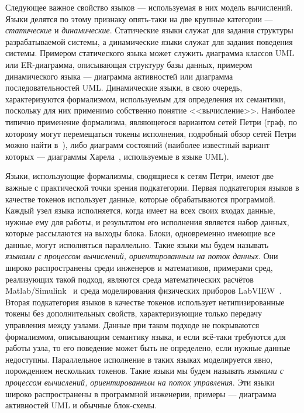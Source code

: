 Следующее важное свойство языков --- используемая в них модель вычислений. Языки 
делятся по этому признаку опять-таки на две крупные категории --- \textit{статические} 
и \textit{динамические}. Статические языки служат для задания структуры разрабатываемой 
системы, а динамические языки служат для задания поведения системы. Примером 
статического языка может служить диаграмма классов \ac{UML} или \ac{ER}-диаграмма, 
описывающая структуру базы данных, примером динамического языка --- диаграмма 
активностей или диаграмма последовательностей \ac{UML}. Динамические языки, в свою 
очередь, характеризуются формализмом, используемым для определения их семантики, 
поскольку для них применимо собственно понятие <<вычисление>>. Наиболее типично 
применение формализма, являющегося вариантом сетей Петри (граф, по которому 
могут перемещаться токены исполнения, подробный обзор сетей Петри можно найти в~\cite{murata1989petri}), 
либо диаграмм состояний (наиболее известный вариант которых --- диаграммы Харела~\cite{harel1987statecharts}, 
используемые в языке \ac{UML}). 

Языки, использующие формализмы, сводящиеся к сетям Петри, имеют две важные с 
практической точки зрения подкатегории. Первая подкатегория языков в качестве 
токенов использует данные, которые обрабатываются программой. Каждый узел языка 
исполняется, когда имеет на всех своих входах данные, нужные ему для работы, 
и результатом его исполнения является набор данных, которые рассылаются на 
выходы блока. Блоки, одновременно имеющие все данные, могут исполняться 
параллельно. Такие языки мы будем называть \textit{языками с процессом вычислений, 
ориентированным на поток данных}. Они широко распространены среди 
инженеров и математиков, примерами сред, реализующих такой подход, являются 
среда математических расчётов Matlab/Simulink~\cite{simulink}
 и среда моделирования физических приборов LabVIEW~\cite{labview}. Вторая подкатегория 
языков в качестве токенов использует нетипизированные токены без дополнительных свойств, 
характеризующие только передачу управления между узлами. Данные при таком подходе не 
покрываются формализмом, описывающим семантику языка, и если всё-таки требуются для работы 
узла, то его поведение может быть не определено, если нужные данные недоступны. 
Параллельное исполнение в таких языках моделируется явно, порождением нескольких 
токенов. Такие языки мы будем называть \textit{языками с процессом вычислений, 
ориентированным на поток управления}. Эти языки широко распространены в 
программной инженерии, примеры --- диаграмма активностей \ac{UML} и обычные 
блок-схемы.


